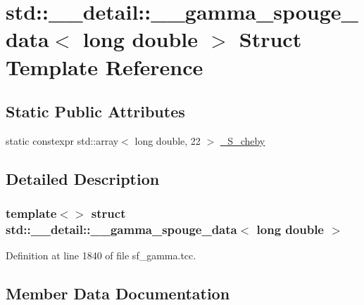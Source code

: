 \hypertarget{structstd_1_1____detail_1_1____gamma__spouge__data_3_01long_01double_01_4}{}\section{std\+:\+:\+\_\+\+\_\+detail\+:\+:\+\_\+\+\_\+gamma\+\_\+spouge\+\_\+data$<$ long double $>$ Struct Template Reference}
\label{structstd_1_1____detail_1_1____gamma__spouge__data_3_01long_01double_01_4}
\subsection*{Static Public Attributes}
\begin{DoxyCompactItemize}
\item 
static constexpr std\+::array$<$ long double, 22 $>$ \hyperlink{structstd_1_1____detail_1_1____gamma__spouge__data_3_01long_01double_01_4_ad1b0c2af63c28d0eaff89430d1b54589}{\+\_\+\+S\+\_\+cheby}
\end{DoxyCompactItemize}


\subsection{Detailed Description}
\subsubsection*{template$<$$>$\newline
struct std\+::\+\_\+\+\_\+detail\+::\+\_\+\+\_\+gamma\+\_\+spouge\+\_\+data$<$ long double $>$}



Definition at line 1840 of file sf\+\_\+gamma.\+tcc.



\subsection{Member Data Documentation}
\mbox{\label{structstd_1_1____detail_1_1____gamma__spouge__data_3_01long_01double_01_4_ad1b0c2af63c28d0eaff89430d1b54589}} 
